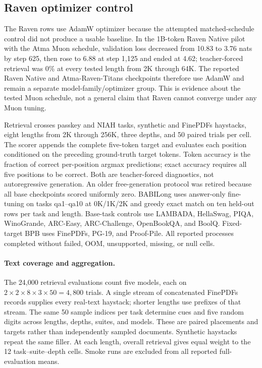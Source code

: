 \subsection{Raven optimizer control}
The Raven rows use AdamW optimizer because the attempted matched-schedule control did not produce a usable baseline. In the 1B-token Raven Native pilot with the Atma Muon schedule, validation loss decreased from 10.83 to 3.76 nats by step 625, then rose to 6.88 at step 1,125 and ended at 4.62; teacher-forced retrieval was 0\% at every tested length from 2K through 64K. The reported Raven Native and Atma-Raven-Titans checkpoints therefore use AdamW and remain a separate model-family/optimizer group. This is evidence about the tested Muon schedule, not a general claim that Raven cannot converge under any Muon tuning.

Retrieval crosses passkey and NIAH tasks, synthetic and FinePDFs haystacks, eight lengths from 2K through 256K, three depths, and 50 paired trials per cell. The scorer appends the complete five-token target and evaluates each position conditioned on the preceding ground-truth target tokens. Token accuracy is the fraction of correct per-position argmax predictions; exact accuracy requires all five positions to be correct. Both are teacher-forced diagnostics, not autoregressive generation. An older free-generation protocol was retired because all base checkpoints scored uniformly zero. BABILong uses answer-only fine-tuning on tasks qa1--qa10 at 0K/1K/2K and greedy exact match on ten held-out rows per task and length. Base-task controls use LAMBADA, HellaSwag, PIQA, WinoGrande, ARC-Easy, ARC-Challenge, OpenBookQA, and BoolQ. Fixed-target BPB uses FinePDFs, PG-19, and Proof-Pile. All reported processes completed without failed, OOM, unsupported, missing, or null cells.

\paragraph{Text coverage and aggregation.}
The 24,000 retrieval evaluations count five models, each on $2\times2\times8\times3\times50=4{,}800$ trials. A single stream of concatenated FinePDFs records supplies every real-text haystack; shorter lengths use prefixes of that stream. The same 50 sample indices per task determine cues and five random digits across lengths, depths, suites, and models. These are paired placements and targets rather than independently sampled documents. Synthetic haystacks repeat the same filler. At each length, overall retrieval gives equal weight to the 12 task--suite--depth cells. Smoke runs are excluded from all reported full-evaluation means.

